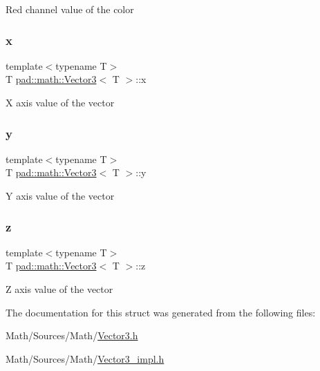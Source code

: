 Red channel value of the color \mbox{\label{structpad_1_1math_1_1_vector3_acf0b6cc0b4fb0a077945332e816e4373}} 
\subsubsection{\texorpdfstring{x}{x}}
{\footnotesize\ttfamily template$<$typename T$>$ \\
T \mbox{\hyperlink{structpad_1_1math_1_1_vector3}{pad\+::math\+::\+Vector3}}$<$ T $>$\+::x}

X axis value of the vector \mbox{\label{structpad_1_1math_1_1_vector3_af6d815461367ca4c2f85115453470934}} 
\subsubsection{\texorpdfstring{y}{y}}
{\footnotesize\ttfamily template$<$typename T$>$ \\
T \mbox{\hyperlink{structpad_1_1math_1_1_vector3}{pad\+::math\+::\+Vector3}}$<$ T $>$\+::y}

Y axis value of the vector \mbox{\label{structpad_1_1math_1_1_vector3_adcd03301042c390430955427765261e5}} 
\subsubsection{\texorpdfstring{z}{z}}
{\footnotesize\ttfamily template$<$typename T$>$ \\
T \mbox{\hyperlink{structpad_1_1math_1_1_vector3}{pad\+::math\+::\+Vector3}}$<$ T $>$\+::z}

Z axis value of the vector 

The documentation for this struct was generated from the following files\+:\begin{DoxyCompactItemize}
\item 
Math/\+Sources/\+Math/\mbox{\hyperlink{_vector3_8h}{Vector3.\+h}}\item 
Math/\+Sources/\+Math/\mbox{\hyperlink{_vector3__impl_8h}{Vector3\+\_\+impl.\+h}}\end{DoxyCompactItemize}
